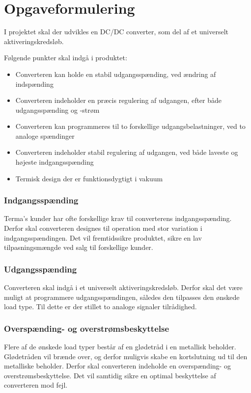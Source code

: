 

\section{Opgaveformulering}
I projektet skal der udvikles en DC/DC converter, som del af et universelt aktiveringskredsløb.   

\noindent Følgende punkter skal indgå i produktet:
\begin{itemize}
	\item Converteren kan holde en stabil udgangsspænding, ved ændring af indspænding
	\item Converteren indeholder en præcis regulering af udgangen, efter både udgangsspænding og -strøm
	\item Converteren kan programmeres til to forskellige udgangsbelastninger, ved to analoge spændinger
	\item Converteren indeholder stabil regulering af udgangen, ved både laveste og højeste indgangsspænding
	\item Termisk design der er funktionsdygtigt i vakuum 
\end{itemize}

\subsubsection*{Indgangsspænding}
\noindent Terma's kunder har ofte forskellige krav til converterens indgangsspænding. Derfor skal converteren designes til operation med stor variation i indgangsspændingen. Det vil fremtidssikre produktet, sikre en lav tilpasningsmængde ved salg til forskellige kunder.  

\subsubsection*{Udgangsspænding}
\noindent Converteren skal indgå i et universelt aktiveringskredsløb. Derfor skal det være muligt at programmere udgangsspændingen, således den tilpasses den ønskede load type. Til dette er der stillet to analoge signaler tilrådighed. 

\subsubsection*{Overspænding- og overstrømsbeskyttelse}
\noindent Flere af de ønskede load typer består af en glødetråd i en metallisk beholder. Glødetråden vil brænde over, og derfor muligvis skabe en kortslutning ud til den metalliske beholder. Derfor skal converteren indeholde en overspænding- og overstrømsbeskyttelse. Det vil samtidig sikre en optimal beskyttelse af converteren mod fejl.

